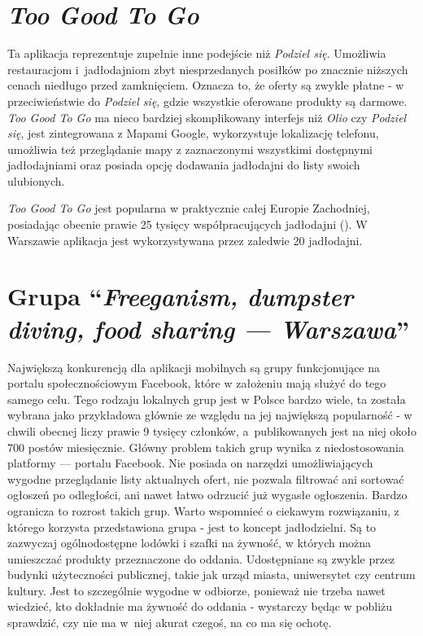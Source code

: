 \documentclass[licencjacka]{pracamgr}
\begin{document}
\section{\textit{Too Good To Go}}
Ta aplikacja reprezentuje zupełnie inne podejście niż \textit{Podziel się}. Umożliwia restauracjom i~jadłodajniom zbyt niesprzedanych posiłków po znacznie niższych cenach niedługo przed zamknięciem. Oznacza to, że oferty są zwykle płatne - w przeciwieństwie do \textit{Podziel się}, gdzie wszystkie oferowane produkty są darmowe. \textit{Too Good To Go} ma nieco bardziej skomplikowany interfejs niż \textit{Olio} czy \textit{Podziel się}, jest zintegrowana z Mapami Google, wykorzystuje lokalizację telefonu, umożliwia też przeglądanie mapy z zaznaczonymi wszystkimi dostępnymi jadłodajniami oraz posiada opcję dodawania jadłodajni do listy swoich ulubionych.

\textit{Too Good To Go} jest popularna w praktycznie całej Europie Zachodniej, posiadając obecnie prawie 25 tysięcy współpracujących jadłodajni (\cite{tgtg}). W Warszawie aplikacja jest wykorzystywana przez zaledwie 20 jadłodajni.

\section{Grupa ``\textit{Freeganism, dumpster diving, food sharing --- Warszawa}''}
Największą konkurencją dla aplikacji mobilnych są grupy funkcjonujące na portalu społecznościowym Facebook, które w założeniu mają służyć do tego samego celu. Tego rodzaju lokalnych grup jest w Polsce bardzo wiele, ta została wybrana jako przykładowa głównie ze względu na jej największą popularność - w chwili obecnej liczy prawie 9 tysięcy członków, a~publikowanych jest na niej około 700 postów miesięcznie. Główny problem takich grup wynika z niedostosowania platformy --- portalu Facebook. Nie posiada on narzędzi umożliwiających wygodne przeglądanie listy aktualnych ofert, nie pozwala filtrować ani sortować ogłoszeń po odległości, ani nawet łatwo odrzucić już wygasłe ogłoszenia. Bardzo ogranicza to rozrost takich grup. Warto wspomnieć o ciekawym rozwiązaniu, z którego korzysta przedstawiona grupa - jest to koncept jadłodzielni. Są to zazwyczaj ogólnodostępne lodówki i szafki na żywność, w których można umieszczać produkty przeznaczone do oddania. Udostępniane są zwykle przez budynki użyteczności publicznej, takie jak urząd miasta, uniwersytet czy centrum kultury. Jest to szczególnie wygodne w odbiorze, ponieważ nie trzeba nawet wiedzieć, kto dokładnie ma żywność do oddania - wystarczy będąc w pobliżu sprawdzić, czy nie ma w~niej akurat czegoś, na co ma się ochotę.
\end{document}
